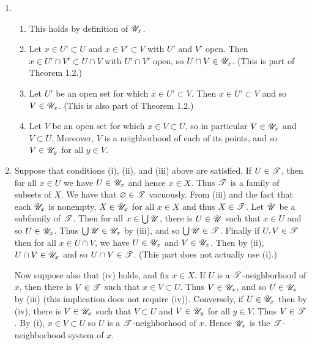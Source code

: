 \begin{prob}
\begin{enumerate}
\item 
\begin{enumerate}[label = (\roman*)]
\item This holds by definition of $\mathscr{U}_x$.

\item Let $x \in U' \subset U$ and $x \in V' \subset V$ with $U'$ and $V'$ open. Then $x \in U'\cap V' \subset U\cap V$ with $U'\cap V'$ open, so $U\cap V \in \mathscr{U}_x$. (This is part of Theorem 1.2.)

\item Let $U'$ be an open set for which $x \in U' \subset V$. Then $x \in U' \subset V$ and so $V \in \mathscr{U}_x$. (This is also part of Theorem 1.2.)

\item Let $V$ be an open set for which $x \in V \subset U$, so in particular $V \in \mathscr{U}_x$ and $V \subset U$. Moreover, $V$ is a neighborhood of each of its points, and so $V \in \mathscr{U}_y$ for all $y \in V$.
\end{enumerate}

\item Suppose that conditions (i), (ii), and (iii) above are satisfied. If $U \in \mathscr{T}$, then for all $x \in U$ we have $U \in \mathscr{U}_x$ and hence $x \in X$. Thus $\mathscr{T}$ is a family of subsets of $X$. We have that $\varnothing \in \mathscr{T}$ vacuously. From (iii) and the fact that each $\mathscr{U}_x$ is nonempty, $X \in \mathscr{U}_x$ for all $x \in X$ and thus $X \in \mathscr{T}$. Let $\mathscr{U}$ be a subfamily of $\mathscr{T}$. Then for all $x \in \bigcup\mathscr{U}$, there is $U \in \mathscr{U}$ such that $x \in U$ and so $U \in \mathscr{U}_x$. Thus $\bigcup\mathscr{U} \in \mathscr{U}_x$ by (iii), and so $\bigcup\mathscr{U} \in \mathscr{T}$. Finally if $U, V \in \mathscr{T}$ then for all $x \in U\cap V$, we have $U \in \mathscr{U}_x$ and $V \in \mathscr{U}_x$. Then by (ii), $U\cap V \in \mathscr{U}_x$ and so $U\cap V \in \mathscr{T}$. (This part does not actually use (i).)

Now suppose also that (iv) holds, and fix $x \in X$. If $U$ is a $\mathscr{T}$-neighborhood of $x$, then there is $V \in \mathscr{T}$ such that $x \in V \subset U$. Thus $V \in \mathscr{U}_x$, and so $U \in \mathscr{U}_x$ by (iii) (this implication does not require (iv)). Conversely, if $U \in \mathscr{U}_x$ then by (iv), there is $V \in \mathscr{U}_x$ such that $V \subset U$ and $V \in \mathscr{U}_y$ for all $y \in V$. Thus $V \in \mathscr{T}$. By (i), $x \in V \subset U$ so $U$ is a $\mathscr{T}$-neighborhood of $x$. Hence $\mathscr{U}_x$ is the $\mathscr{T}$-neighborhood system of $x$.
\end{enumerate}
\end{prob}

